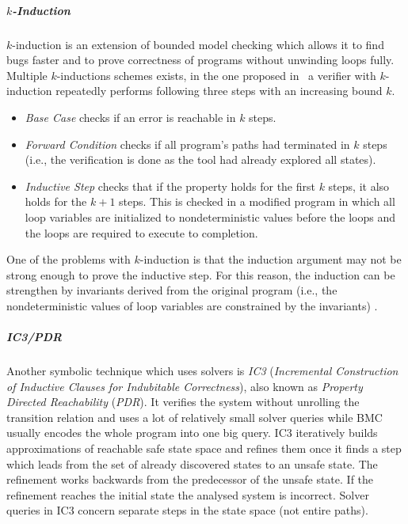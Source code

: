 \subparagraph{$k$-Induction}

$k$-induction  is an extension of
bounded model checking which allows it to find bugs faster and to prove
correctness of programs without unwinding loops fully.
Multiple $k$-inductions schemes exists, in the one proposed in~ a verifier with $k$-induction repeatedly performs following three steps with an increasing bound $k$.
\begin{itemize}
    \item \emph{Base Case} checks if an error is reachable in $k$ steps.
    \item \emph{Forward Condition} checks if all program's paths had terminated in
        $k$ steps (i.e., the verification is done as the tool had already
        explored all states).
    \item \emph{Inductive Step} checks that if the property holds for the first $k$
        steps, it also holds for the $k+1$ steps.
        This is checked in a modified program in which all loop variables are
        initialized to nondeterministic values before the loops and the loops
        are required to execute to completion.
\end{itemize}
One of the problems with $k$-induction is that the induction argument may not be strong enough to prove the inductive step.
For this reason, the induction can be strengthen by invariants derived from the original program (i.e., the nondeterministic values of loop variables are constrained by the invariants) .

\subparagraph{IC3/PDR}

Another symbolic technique which uses solvers is \emph{IC3} (\emph{Incremental Construction of Inductive Clauses for Indubitable Correctness}), also known as \emph{Property Directed Reachability} (\emph{PDR}).
It verifies the system without unrolling the transition relation and uses a lot of relatively small solver queries while BMC usually encodes the whole program into one big query.
IC3 iteratively builds approximations of reachable safe state space and refines them once it finds a step which leads from the set of already discovered states to an unsafe state.
The refinement works backwards from the predecessor of the unsafe state.
If the refinement reaches the initial state the analysed system is incorrect.
Solver queries in IC3 concern separate steps in the state space (not entire paths).

